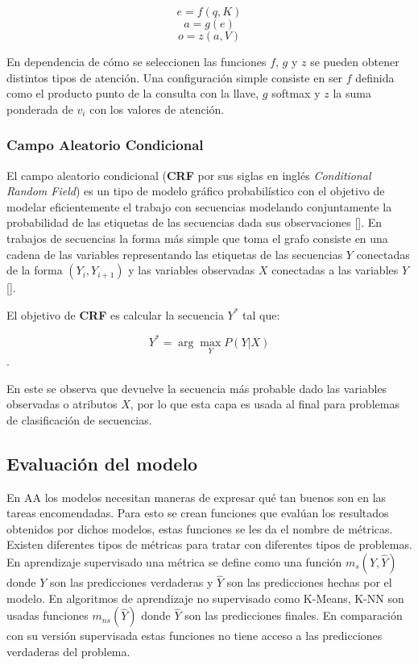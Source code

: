 \begin{equation}
	e = f(q, K)
\end{equation}
\begin{equation}
	a = g(e)
\end{equation}
\begin{equation}
	o = z(a, V)
\end{equation}

En dependencia de cómo se seleccionen las funciones $f$, $g$ y $z$ se pueden obtener distintos tipos de atención.
Una configuración simple consiste en ser $f$ definida como el producto punto de la consulta con la llave,
$g$ softmax y $z$ la suma ponderada de $v_i$ con los valores de atención. 

\subsubsection{Campo Aleatorio Condicional}


El campo aleatorio condicional (\textbf{CRF} por sus siglas en inglés \emph{Conditional Random Field}) es un 
tipo de modelo gráfico probabilístico con el objetivo de modelar eficientemente el trabajo con secuencias 
modelando conjuntamente la probabilidad de las etiquetas de las secuencias dada sus observaciones [\cite{lafferty2001conditional}].
En trabajos de secuencias la forma más simple que toma el grafo consiste en una cadena de las variables representando
las etiquetas de las secuencias $Y$ conectadas de la forma $(Y_i, Y_{i+1})$ y las variables observadas $X$ conectadas
a las variables $Y$ [\cite{wallach2004conditional}].

El objetivo de \textbf{CRF} es calcular la secuencia $Y^*$ tal que:

\begin{equation}
	Y^* = \arg \max_Y P(Y | X)
\end{equation}\label{eq:crf}.

En este se observa que devuelve la secuencia más probable dado las variables observadas o atributos $X$,
por lo que esta capa es usada al final para problemas de clasificación de secuencias.

\subsection{Evaluación del modelo}

En AA los modelos necesitan maneras de expresar qué tan buenos son 
en las tareas encomendadas. Para esto se crean funciones que evalúan los resultados obtenidos
por dichos modelos, estas funciones se les da el nombre de métricas. Existen diferentes tipos de
métricas para tratar con diferentes tipos de problemas. En aprendizaje supervisado una métrica se
define como una función $m_s(Y, \hat{Y})$ donde $Y$ son las predicciones verdaderas y $\hat{Y}$ son las predicciones
hechas por el modelo. En algoritmos de aprendizaje no supervisado como K-Means, K-NN son usadas funciones $m_{ns}(\hat{Y})$
donde $\hat{Y}$ son las predicciones finales. En comparación con su versión supervisada estas funciones no tiene acceso
a las predicciones verdaderas del problema.

